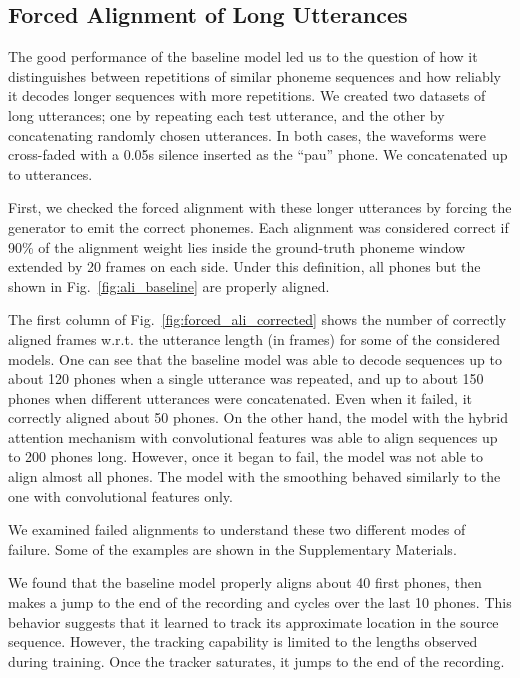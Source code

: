 \documentclass{article}
\begin{document}
\subsection{Forced Alignment of Long Utterances}

The good performance of the baseline model led us to the question of how it
distinguishes between repetitions of similar phoneme sequences and how reliably
it decodes longer sequences with more repetitions. We created two datasets of
long utterances; one by repeating each test utterance, and the other by
concatenating randomly chosen utterances. In both cases, the waveforms were
cross-faded with a 0.05s silence inserted as the ``pau'' phone. We concatenated
up to  utterances.

First, we checked the forced alignment with these longer utterances by forcing
the generator to emit the correct phonemes. Each alignment was considered
correct if 90\% of the alignment weight lies inside the ground-truth phoneme
window extended by 20 frames on each side. Under this definition, all
phones but the
 shown in Fig.~\ref{fig:ali_baseline} are properly
aligned.

The first column of Fig.~\ref{fig:forced_ali_corrected} shows the number of
correctly aligned frames w.r.t. the utterance length (in frames) for some of the
considered models. One can see that the baseline model was able to decode
sequences up to about 120 phones when a single utterance was repeated, and up to
about 150 phones when different utterances were concatenated. Even when it
failed, it correctly aligned about 50 phones. On the other hand, the model with
the hybrid attention mechanism with convolutional features was able to align
sequences up to 200 phones long. However, once it began to fail, the model was
not able to align almost all phones. The model with the smoothing behaved
similarly to the one with convolutional features only.

We examined failed alignments to understand these two different modes of
failure. Some of the examples are shown in the Supplementary Materials.

We found that the baseline model properly aligns about 40 first phones, then
makes a jump to the end of the recording and cycles over the last 10 phones.
This behavior suggests that it learned to track its approximate location in the
source sequence. However, the tracking capability is limited to the lengths
observed during training. Once the tracker saturates, it jumps to the end of the
recording.
\end{document}
